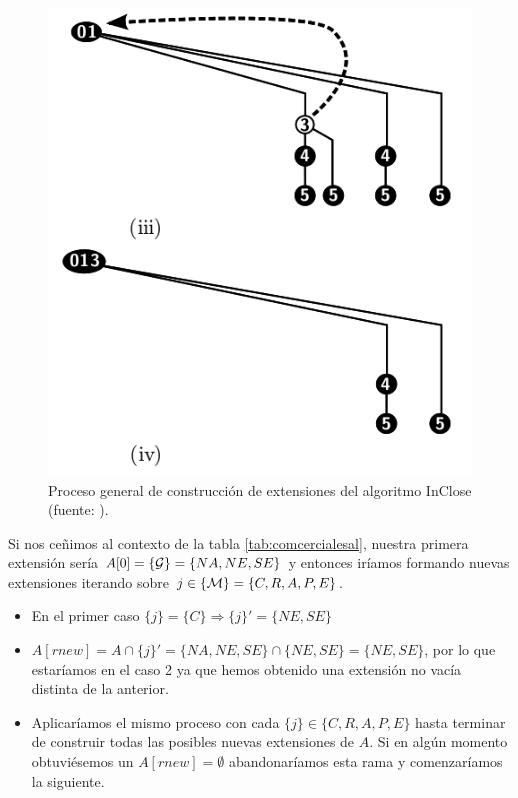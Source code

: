 \documentclass[oneside,openright,titlepage,numbers=noenddot,openany,headinclude,footinclude=true,
cleardoublepage=empty,abstractoff,BCOR=5mm,paper=a4,fontsize=12pt,main=spanish]{scrreprt}
\begin{document}
\begin{figure}[H]
\begin{minipage}{.6\textwidth}
\end{minipage}%
\begin{minipage}{.4\textwidth}
  \centering
  \includegraphics[width=1\linewidth]{images/inclose2.png}

\end{minipage}
\caption{Proceso general de construcción de extensiones del algoritmo InClose (fuente: \cite{inclose}). }
  \label{fig:test1}
\end{figure}

Si nos ceñimos al contexto de la tabla \ref{tab:comcercialesal}, nuestra primera extensión sería $A[0]=\{\mathcal{G}\}=\{NA,NE,SE\}$ y entonces iríamos formando nuevas extensiones iterando sobre $j \in \{\mathcal{M}\}=\{C,R,A,P,E\}$.

\begin{itemize}
    \item En el primer caso $\{j\}=\{C\} \Longrightarrow \{j\}'=\{NE,SE\}$
    \item[] $A[rnew] = A \cap \{j\}'=\{NA,NE,SE\} \cap \{NE,SE\}= \{NE,SE\}$, por lo que estaríamos en el caso 2 ya que hemos obtenido una extensión no vacía distinta de la anterior. 
    \item Aplicaríamos el mismo proceso con cada $\{j\} \in \{C,R,A,P,E\}$ hasta terminar de construir todas las posibles nuevas extensiones de $A$. Si en algún momento obtuviésemos un $A[rnew] =\emptyset$ abandonaríamos esta rama y comenzaríamos la siguiente.
\end{itemize}
\end{document}
